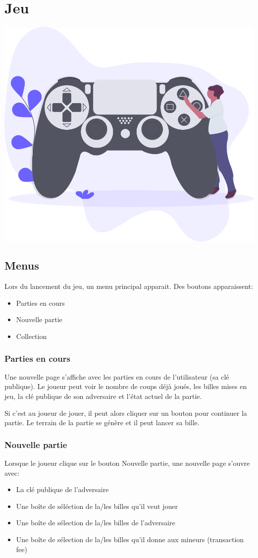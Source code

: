 \documentclass{article}
\begin{document}
\newpage

\section{Jeu}
\includegraphics[width=0.3\linewidth]{assets/gaming.png}\\
\subsection{Menus}

Lors du lancement du jeu, un menu principal apparait. Des boutons apparaissent:
\begin{itemize}
    \item Parties en cours
    \item Nouvelle partie
    \item Collection
\end{itemize}

\subsubsection{Parties en cours}
Une nouvelle page s'affiche avec les parties en cours de l'utilisateur (sa clé publique). Le joueur peut voir le nombre de coups déjà joués, les billes mises en jeu, la clé publique de son adversaire et l'état actuel de la partie.

Si c'est au joueur de jouer, il peut alors cliquer sur un bouton pour continuer la partie. Le terrain de la partie se génère et il peut lancer sa bille.

\subsubsection{Nouvelle partie}
Lorsque le joueur clique sur le bouton Nouvelle partie, une nouvelle page s'ouvre avec:
\begin{itemize}
    \item La clé publique de l'adversaire
    \item Une boîte de séléction de la/les billes qu'il veut jouer
    \item Une boîte de sélection de la/les billes de l'adversaire
    \item Une boîte de sélection de la/les billes qu'il donne aux mineurs (transaction fee)
\end{itemize}
\end{document}
